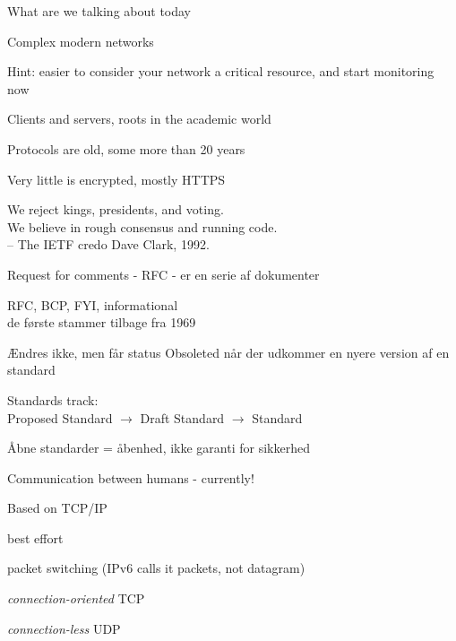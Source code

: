 \documentclass[Screen16to9,17pt]{foils}
\begin{document}
\begin{list2}
\item What are we talking about today
\item Complex modern networks

\item Hint: easier to consider your network a critical resource, and start monitoring now
\end{list2}







\begin{list2}
\item Clients and servers, roots in the academic world
\item Protocols are old, some more than 20 years
\item Very little is encrypted, mostly HTTPS
\end{list2}



{\hlkbig \color{titlecolor}
We reject kings, presidents, and voting.\\
We believe in rough consensus and running code.\\
-- The IETF credo Dave Clark, 1992.}

\begin{list1}
\item Request for comments - RFC - er en serie af dokumenter
\item RFC, BCP, FYI, informational\\
de første stammer tilbage fra 1969
\item Ændres ikke, men får status Obsoleted når der udkommer en nyere
  version af en standard
\item Standards track:\\
Proposed Standard $\rightarrow$ Draft Standard $\rightarrow$ Standard
\item  Åbne standarder = åbenhed, ikke garanti for sikkerhed
\end{list1}



\begin{list1}
\item Communication between humans - currently!
\item Based on TCP/IP
\begin{list2}
\item best effort
\item packet switching (IPv6 calls it packets, not datagram)
\item \emph{connection-oriented} TCP
\item \emph{connection-less} UDP
\end{list2}
\end{list1}
\end{document}
